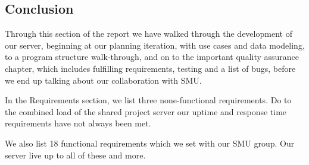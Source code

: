 \subsection{Conclusion}
Through this section of the report we have walked through the development of our server, beginning at our planning iteration, with use cases and data modeling, to a program structure walk-through, and on to the important quality assurance chapter, which includes fulfilling requirements, testing and a list of bugs, before we end up talking about our collaboration with SMU.

In the Requirements section, we list three none-functional requirements. Do to the combined load of the shared project server our uptime and response time requirements have not always been met.

We also list 18 functional requirements which we set with our SMU group. Our server live up to all of these and more.
\newpage